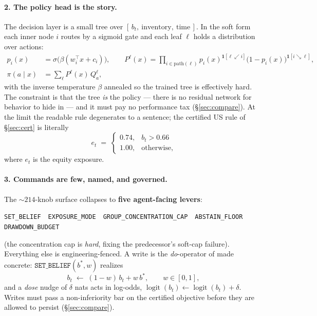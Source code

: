 \documentclass[11pt]{article}
\newcommand{\ind}{\mathbf{1}}
\begin{document}
\paragraph{2. The policy head is the story.} The decision layer is a small tree over
$[\,b_t,\ \text{inventory},\ \text{time}\,]$. In the soft form \citep{frosst2017} each inner
node $i$ routes by a sigmoid gate and each leaf $\ell$ holds a distribution over actions:
\begin{align}
p_i(x) &= \sigma\!\big(\beta(w_i^{\top}x + c_i)\big), \qquad
P^{\ell}(x) = \prod_{i \in \text{path}(\ell)} p_i(x)^{\ind[\ell \swarrow i]}
\big(1-p_i(x)\big)^{\ind[i \searrow \ell]},
\label{eq:tree}\\
\pi(a\mid x) &= \sum_{\ell} P^{\ell}(x)\, Q^{\ell}_a ,\nonumber
\end{align}
with the inverse temperature $\beta$ annealed so the trained tree is effectively hard. The
constraint is that the tree \emph{is} the policy --- there is no residual network for behavior
to hide in --- and it must pay no performance tax (\S\ref{sec:compare}). At the limit the
readable rule degenerates to a sentence; the certified US rule of \S\ref{sec:cert} is literally
\begin{equation}
e_t \;=\; \begin{cases} 0.74, & b_t > 0.66\\[2pt] 1.00, & \text{otherwise,}\end{cases}
\label{eq:rule}
\end{equation}
where $e_t$ is the equity exposure.

\paragraph{3. Commands are few, named, and governed.} The ${\sim}214$-knob surface collapses to
\textbf{five agent-facing levers}:
\begin{center}\small
\texttt{SET\_BELIEF} \,\textperiodcentered\, \texttt{EXPOSURE\_MODE} \,\textperiodcentered\,
\texttt{GROUP\_CONCENTRATION\_CAP} \,\textperiodcentered\,
\texttt{ABSTAIN\_FLOOR} \,\textperiodcentered\, \texttt{DRAWDOWN\_BUDGET}
\end{center}
(the concentration cap is \emph{hard}, fixing the predecessor's soft-cap failure). Everything
else is engineering-fenced. A write is the \emph{do}-operator of \citet{pearl2009} made
concrete: $\texttt{SET\_BELIEF}(b^{*}, w)$ realizes
\begin{equation}
b_t \;\leftarrow\; (1-w)\, b_t + w\, b^{*}, \qquad w \in [0,1],
\label{eq:write}
\end{equation}
and a \emph{dose} nudge of $\delta$ nats acts in log-odds,
$\operatorname{logit}(b_t) \leftarrow \operatorname{logit}(b_t) + \delta$. Writes must pass a
non-inferiority bar on the certified objective before they are allowed to persist
(\S\ref{sec:compare}).
\end{document}
